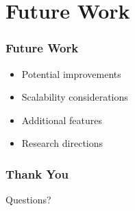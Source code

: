 \documentclass{beamer}
\begin{document}
\section{Future Work}
\begin{frame}
\frametitle{Future Work}
\begin{itemize}
    \item Potential improvements
    \item Scalability considerations
    \item Additional features
    \item Research directions
\end{itemize}
\end{frame}

\begin{frame}
\frametitle{Thank You}
\begin{center}
    Questions?
\end{center}
\end{frame}
\end{document}
